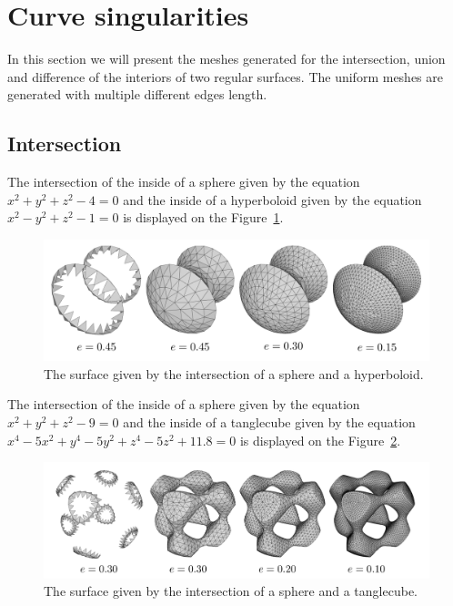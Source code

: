 \section{Curve singularities}
In this section we will present the meshes generated for the intersection, union 
and difference of the interiors of two regular surfaces.
The uniform meshes are generated with multiple different edges length.

\subsection{Intersection}
The intersection of the inside of a sphere given by the equation
$x^2+y^2+z^2-4=0$ and the inside of a hyperboloid given by the 
equation $x^2-y^2+z^2-1=0$ is displayed on the Figure~\ref{img:71}.
\begin{figure}[h!]
    \centerline{\includegraphics[scale=0.5]{images/img71}}
    \caption[The surface given by the intersection of a sphere and a hyperboloid]
    {The surface given by the intersection of a sphere and a hyperboloid.}
    \label{img:71}
\end{figure}

The intersection of the inside of a sphere given by the equation
$x^2+y^2+z^2-9=0$ and the inside of a tanglecube given by the 
equation $x^4-5x^2+y^4-5y^2+z^4-5z^2+11.8=0$ is displayed on the Figure~\ref{img:73}.
\begin{figure}[h!]
    \centerline{\includegraphics[scale=0.5]{images/img73}}
    \caption[The surface given by the intersection of a sphere and a tanglecube]
    {The surface given by the intersection of a sphere and a tanglecube.}
    \label{img:73}
\end{figure}

